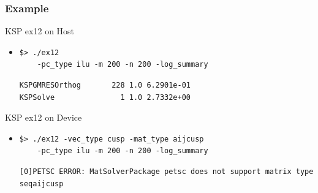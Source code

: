 \begin{frame}[fragile]
\frametitle{Example}
  \begin{block}{KSP ex12 on Host}
  \begin{itemize}
   \item
    \begin{lstlisting}
$> ./ex12
    -pc_type ilu -m 200 -n 200 -log_summary
    \end{lstlisting}
    \begin{lstlisting}
KSPGMRESOrthog       228 1.0 6.2901e-01
KSPSolve               1 1.0 2.7332e+00
    \end{lstlisting}

  \end{itemize}
  \end{block}

  
  \begin{block}{KSP ex12 on Device}
  \begin{itemize}
   \item
    \begin{lstlisting}
$> ./ex12 -vec_type cusp -mat_type aijcusp
    -pc_type ilu -m 200 -n 200 -log_summary
    \end{lstlisting}
    \begin{lstlisting}
[0]PETSC ERROR: MatSolverPackage petsc does not support matrix type seqaijcusp
    \end{lstlisting}

  \end{itemize}
  \end{block}
  \vspace*{0.4cm}

\end{frame}


